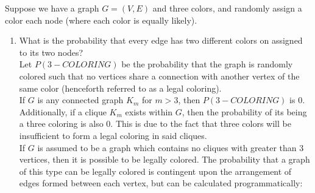 \documentclass{article}
\begin{document}
   
\nextprob
Suppose we have a graph $G=(V,E)$ and three colors, and randomly assign a color
each node (where each color is equally likely).
\begin{enumerate}
    \item What is the probability that every edge has two different colors on
        assigned to its two nodes? \\
        
        Let $P(3-COLORING)$ be the probability that the graph is randomly colored such that no vertices share a connection with another vertex of the same color (henceforth referred to as a legal coloring). \\
        
        If $G$ is any connected graph $K_m$ for $m > 3$, then $P(3-COLORING)$ is 0. Additionally, if a clique $K_m$ exists within $G$, then the probability of its being a three coloring is also 0. This is due to the fact that three colors will be insufficient to form a legal coloring in said cliques. \\
        
        If $G$ is assumed to be a graph which contains no cliques with greater than 3 vertices, then it is possible to be legally colored. The probability that a graph of this type can be legally colored is contingent upon the arrangement of edges formed between each vertex, but can be calculated programmatically:
        

\end{enumerate}
\end{document}
